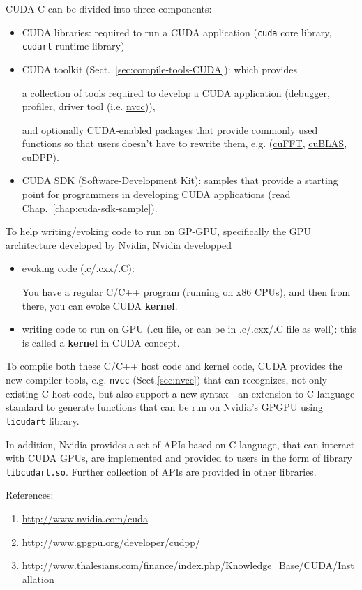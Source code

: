 CUDA C can be divided into three components:
\begin{itemize}
\item CUDA libraries: required to run a CUDA application
  (\verb!cuda! core library, \verb!cudart!  runtime library)

\item CUDA toolkit (Sect.~\ref{sec:compile-tools-CUDA}): which provides 

a collection of tools required to develop a CUDA application (debugger,
profiler, driver tool (i.e. \hyperref[sec:nvcc]{nvcc})),

and optionally CUDA-enabled packages that provide commonly used functions so
that users doesn't have to rewrite them, e.g. (\hyperref[chap:cufft]{cuFFT},
\hyperref[chap:cublas]{cuBLAS}, \hyperref[chap:cudpp]{cuDPP}).

\item CUDA SDK (Software-Development Kit): samples that provide a starting point
for programmers in developing CUDA applications (read
Chap.~\ref{chap:cuda-sdk-sample}).
\end{itemize}

To help writing/evoking code to run on GP-GPU, specifically the GPU architecture
developed by Nvidia, Nvidia developped 
\begin{itemize}
  \item evoking code (.c/.cxx/.C): 
  
You have a regular C/C++ program (running on x86 CPUs), and then from there, you
can evoke CUDA {\bf kernel}.
  
  \item writing code to run on GPU (.cu file, or can be in .c/.cxx/.C file as
  well): this is called a {\bf kernel} in CUDA concept.
  
\end{itemize}
To compile both these C/C++ host code and kernel code,  CUDA provides the new
compiler tools, e.g. \verb!nvcc! (Sect.\ref{sec:nvcc}) that can recognizes, not
only existing C-host-code, but also support a new syntax - an extension to C
language standard to generate functions that can be run on Nvidia's GPGPU using
\verb!licudart! library.

In addition, Nvidia provides a set of APIs based on C language, that can
interact with CUDA GPUs, are implemented and provided to users in the form of
library \verb!libcudart.so!. Further collection of APIs are provided in other
libraries.


References:
\begin{enumerate}
\item \url{http://www.nvidia.com/cuda}
\item \url{http://www.gpgpu.org/developer/cudpp/}
\item \url{http://www.thalesians.com/finance/index.php/Knowledge_Base/CUDA/Installation}
\end{enumerate}

